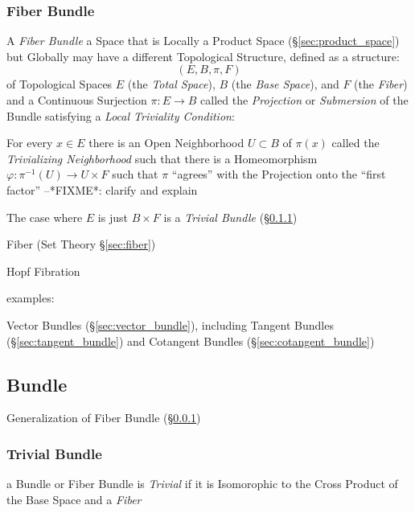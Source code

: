 \subsubsection{Fiber Bundle}\label{sec:fiber_bundle}

A \emph{Fiber Bundle} a Space that is Locally a Product Space
(\S\ref{sec:product_space}) but Globally may have a different Topological
Structure, defined as a structure:
\[
  (E, B, \pi, F)
\]
of Topological Spaces $E$ (the \emph{Total Space}), $B$ (the \emph{Base
  Space}), and $F$ (the \emph{Fiber}) and a Continuous Surjection $\pi : E
\rightarrow B$ called the \emph{Projection} or \emph{Submersion} of the Bundle
satisfying a \emph{Local Triviality Condition}:

For every $x \in E$ there is an Open Neighborhood $U \subset B$ of $\pi(x)$
called the \emph{Trivializing Neighborhood} such that there is a Homeomorphism
$\varphi : \pi^{-1}(U) \rightarrow U \times F$ such that $\pi$ ``agrees'' with
the Projection onto the ``first factor'' --*FIXME*: clarify and explain

The case where $E$ is just $B \times F$ is a \emph{Trivial Bundle}
(\S\ref{sec:trivial_bundle})

\fist Fiber (Set Theory \S\ref{sec:fiber})

Hopf Fibration

examples:

Vector Bundles (\S\ref{sec:vector_bundle}), including Tangent Bundles
(\S\ref{sec:tangent_bundle}) and Cotangent Bundles
(\S\ref{sec:cotangent_bundle})



\subsection{Bundle}\label{sec:bundle}

Generalization of Fiber Bundle (\S\ref{sec:fiber_bundle})



\subsubsection{Trivial Bundle}\label{sec:trivial_bundle}

a Bundle or Fiber Bundle is \emph{Trivial} if it is Isomorophic to the Cross
Product of the Base Space and a \emph{Fiber}

